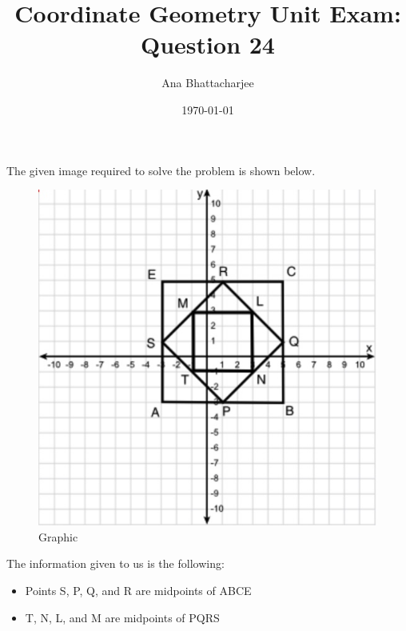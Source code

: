 \documentclass{article}
\begin{document}
\title{Coordinate Geometry Unit Exam: Question 24}
\author{Ana Bhattacharjee}
\date{\today}
\maketitle{}

\begin{center}
The given image required to solve the problem is shown below.
\begin{figure}[!htbp]
  \includegraphics[width=0.9\columnwidth]{q24_figure}
  \caption{Graphic}
\end{figure}
\par 
The information given to us is the following:
\begin{itemize}
  \item Points S, P, Q, and R are midpoints of ABCE
  \item T, N, L, and M are midpoints of PQRS
\end{itemize}
\end{center}
\end{document}
